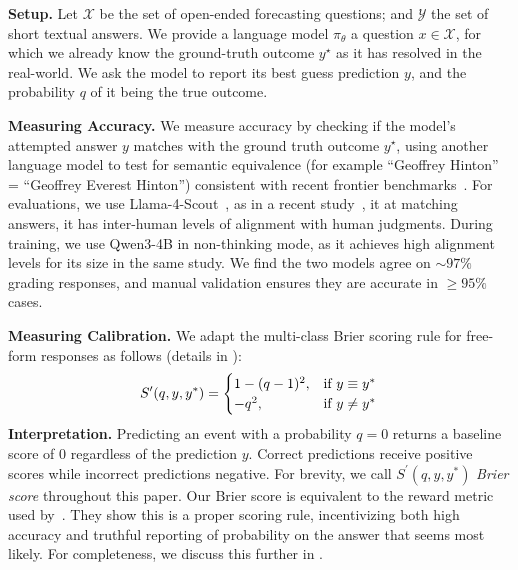 \documentclass{article} %
\begin{document}
 \textbf{Setup.} Let $\mathcal{X}$ be the set of open-ended forecasting questions; and $\mathcal{Y}$ the set of short textual answers. We provide a language model $\pi_\theta$ a question $x \in \mathcal{X}$, for which we already know the ground-truth outcome $y^\star$ as it has resolved in the real-world. We ask the model to report its best guess prediction $y$, and the probability $q$ of it being the true outcome. \vspace{0.15cm} 

\textbf{Measuring Accuracy.} We measure accuracy by checking if the model's attempted answer $y$ matches with the ground truth outcome $y^\star$, using another language model to test for semantic equivalence (for example ``Geoffrey Hinton'' = ``Geoffrey Everest Hinton'') consistent with recent frontier benchmarks~\citep{wei2024measuringshortformfactualitylarge, phan2025humanity}. For evaluations, we use Llama-4-Scout~\citep{meta_llama4_2025}, as in a recent study~\citep{chandak2025answer}, it at matching answers, it has inter-human levels of alignment with human judgments. During training, we use Qwen3-4B in non-thinking mode, as it achieves high alignment levels for its size in the same study. We find the two models agree on $\sim 97\%$ grading responses, and manual validation ensures they are accurate in $\ge 95\%$ cases.\vspace{0.15cm} 

\textbf{Measuring Calibration.} We adapt the multi-class Brier scoring rule \citep{mucsanyi2023trustworthy} for free-form responses as follows (details in ):
$$
S^\prime(q, y, y^*) = \begin{cases}
    1 -(q - 1)^2, & \text{if } y \equiv y^*\\
     - q^2, & \text{if } y \neq y^*
    \end{cases} \\
    \label{eq:rlcr}
$$
 \textbf{Interpretation.} Predicting an event with a probability $q=0$ returns a baseline score of $0$ regardless of the prediction $y$. Correct predictions receive positive scores while incorrect predictions negative. For brevity, we call $S^\prime(q, y, y^*)$ \emph{Brier score} throughout this paper. Our Brier score is equivalent to the reward metric used by~\citet{damani2025beyond}. They show this is a proper scoring rule, incentivizing both high accuracy and truthful reporting of probability on the answer that seems most likely. For completeness, we discuss this further in .\vspace{0.15cm} 
\end{document}
